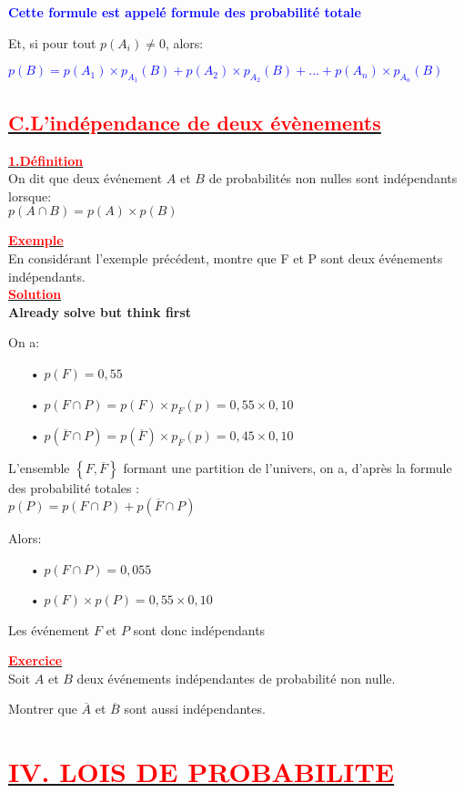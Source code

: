 \documentclass[12pt]{article}
\begin{document}
\textbf{\textcolor{blue}{Cette formule est appelé formule des probabilité totale}}

Et, si pour tout $p(A_{i}) \neq 0$, alors:

\textcolor{blue}{$p(B)=p(A_{1})\times p_{A_{1}}(B)+p(A_{2})\times p_{A_{2}}(B)+...+p(A_{n})\times p_{A_{n}}(B)$}
\subsection*{\underline{\textbf{\textcolor{red}{C.L'indépendance de deux évènements}}}}
\underline{\textbf{\textcolor{red}{1.Définition}}}\\
On dit que deux événement $A$ et $B$ de probabilités non nulles sont indépendants lorsque:\\
$p(A\cap B)=p(A)\times p(B)$

\underline{\textbf{\textcolor{red}{Exemple}}}\\
En considérant l'exemple précédent, montre que F et P sont deux événements indépendants.\\
\underline{\textbf{\textcolor{red}{Solution}}}\\
\textbf{Already solve but think first}

On a:
\begin{itemize}
\item[•]$p(F)=0,55$
\item[•] $p(F\cap P)=p(F)\times p_{F}(p)=0,55\times 0,10 $
\item[•] $p(\overline{F}\cap P)=p(\overline{F})\times p_{\overline{F}}(p)=0,45\times 0,10$
\end{itemize}
L'ensemble $\left\lbrace F, \overline{F} \right\rbrace $ formant une partition de l'univers, on a, d'après la formule des probabilité totales :\\
$p(P)=p(F\cap P)+p(\overline{F}\cap P)$

Alors:
\begin{itemize}
\item[•] $p(F\cap P)=0,055$
\item[•] $p(F)\times p(P)=0,55\times 0,10$
\end{itemize}
Les événement $F$ et $P$ sont donc indépendants

\underline{\textbf{\textcolor{red}{Exercice}}}\\
Soit $A$ et $B$ deux événements indépendantes de probabilité non nulle.

Montrer que $\overline{A}$ et $\overline{B}$ sont aussi indépendantes.
\section*{\underline{\textbf{\textcolor{red}{IV. LOIS DE PROBABILITE}}}}
\end{document}
